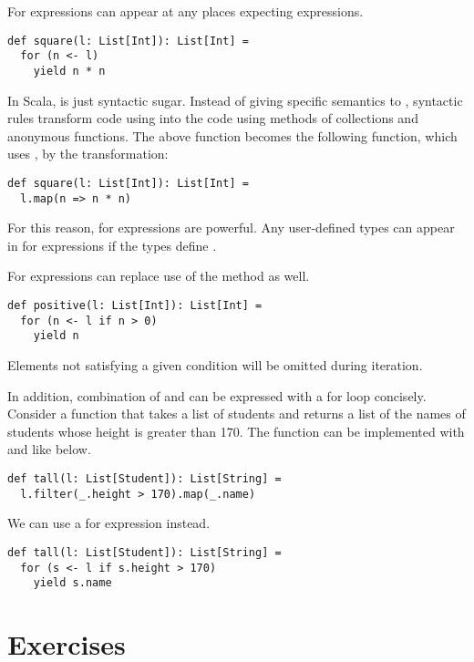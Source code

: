 For expressions can appear at any places expecting expressions.

\begin{verbatim}
def square(l: List[Int]): List[Int] =
  for (n <- l)
    yield n * n
\end{verbatim}

In Scala,  is just syntactic sugar. Instead of giving specific
semantics to , syntactic rules transform code using  into the
code using methods of collections and anonymous functions. The above function becomes
the following function, which uses , by the transformation:

\begin{verbatim}
def square(l: List[Int]): List[Int] =
  l.map(n => n * n)
\end{verbatim}

For this reason, for expressions are powerful. Any
user-defined types can appear in for expressions if the
types define .

For expressions can replace use of the  method as well.

\begin{verbatim}
def positive(l: List[Int]): List[Int] =
  for (n <- l if n > 0)
    yield n
\end{verbatim}

Elements not satisfying a given condition will be omitted during iteration.

In addition, combination of  and  can be expressed with a
for loop concisely. Consider a function that takes a list of students and
returns a list of the names of students whose height is greater than 170.
The function can be implemented with  and  like below.

\begin{verbatim}
def tall(l: List[Student]): List[String] =
  l.filter(_.height > 170).map(_.name)
\end{verbatim}

We can use a for expression instead.

\begin{verbatim}
def tall(l: List[Student]): List[String] =
  for (s <- l if s.height > 170)
    yield s.name
\end{verbatim}

\section{Exercises}

